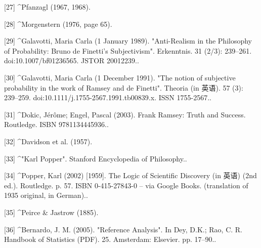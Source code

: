 [27]
^Pfanzagl (1967, 1968).

[28]
^Morgenstern (1976, page 65).

[29]
^Galavotti, Maria Carla (1 January 1989). "Anti-Realism in the Philosophy of Probability: Bruno de Finetti's Subjectivism". Erkenntnis. 31 (2/3): 239–261. doi:10.1007/bf01236565. JSTOR 20012239..

[30]
^Galavotti, Maria Carla (1 December 1991). "The notion of subjective probability in the work of Ramsey and de Finetti". Theoria (in 英语). 57 (3): 239–259. doi:10.1111/j.1755-2567.1991.tb00839.x. ISSN 1755-2567..

[31]
^Dokic, Jérôme; Engel, Pascal (2003). Frank Ramsey: Truth and Success. Routledge. ISBN 9781134445936..

[32]
^Davidson et al. (1957).

[33]
^"Karl Popper". Stanford Encyclopedia of Philosophy..

[34]
^Popper, Karl (2002) [1959]. The Logic of Scientific Discovery (in 英语) (2nd ed.). Routledge. p. 57. ISBN 0-415-27843-0 – via Google Books. (translation of 1935 original, in German)..

[35]
^Peirce & Jastrow (1885).

[36]
^Bernardo, J. M. (2005). "Reference Analysis". In Dey, D.K.; Rao, C. R. Handbook of Statistics (PDF). 25. Amsterdam: Elsevier. pp. 17–90..